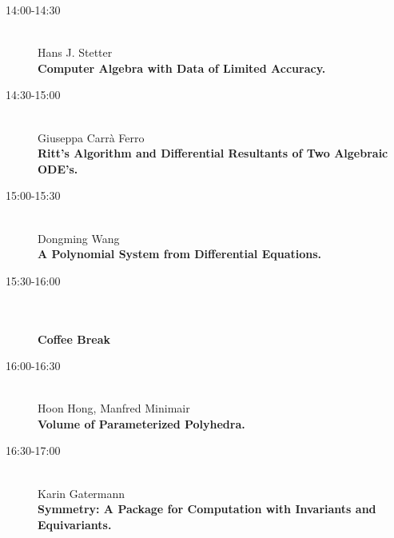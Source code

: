 \begin{description}
\item[14:00-14:30] \ \\
  Hans J. Stetter\\
  {\bf Computer Algebra with Data of Limited Accuracy.} 
\item[14:30-15:00] \ \\
  Giuseppa Carr\`a Ferro\\
  {\bf Ritt's Algorithm and Differential Resultants of Two Algebraic ODE's.} 
\item[15:00-15:30] \ \\
  Dongming Wang\\
  {\bf A Polynomial System from Differential Equations.} 
\item[15:30-16:00] \ \\
  \\
  {\bf Coffee Break} \\
\item[16:00-16:30] \ \\
  Hoon Hong, Manfred Minimair\\
  {\bf Volume of Parameterized Polyhedra.} 
\item[16:30-17:00] \ \\
  Karin Gatermann\\
  {\bf Symmetry: A Package for Computation with Invariants and Equivariants.} 
\end{description}


